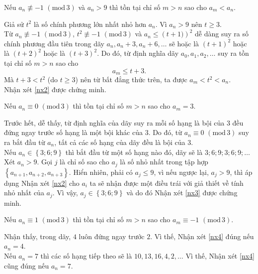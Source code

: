\begin{bt}
{		\begin{nx}[2]\label{nx2} Nếu $a_n\not\equiv-1\,\, (\mbox{mod}\,3)$ và $a_n>9$ thì tồn tại chỉ số $m>n$ sao cho $a_m<a_n$.
		\end{nx}
		\begin{cm} Giả sử $t^2$ là số chính phương lớn nhất nhỏ hơn $a_n$. Vì $a_n>9$ nên $t\geq 3$.\\
			Từ $a_n\not\equiv-1\,\, (\mbox{mod}\,3)$, $t^2\not\equiv-1\,\, (\mbox{mod}\,3)$ và $a_n\leq\left(t+1)\right)^2$ dễ dàng suy ra số chính phương đầu tiên trong dãy $a_n,a_n+3,a_n+6,\ldots$ sẽ hoặc là $\left(t+1\right)^2$ hoặc là $\left(t+2\right)^2$ hoặc là $\left(t+3\right)^2$. Do đó, từ định nghĩa dãy $a_0,a_1,a_2,\ldots$ suy ra tồn tại chỉ số $m>n$ sao cho $$a_m\leq t+3.$$ 
			Mà $t+3<t^2$ (do $t\geq 3$) nên từ bất đẳng thức trên, ta được $a_m<t^2<a_n$.\\
			Nhận xét \ref{nx2} được chứng minh.
		\end{cm}
		\begin{nx}[3]\label{nx3} Nếu $a_n\equiv 0\,\, (\mbox{mod}\,3)$ thì tồn tại chỉ số $m>n$ sao cho $a_m=3$.
		\end{nx}
		\begin{cm} Trước hết, dễ thấy, từ định nghĩa của dãy suy ra mỗi số hạng là bội của $3$ đều đứng ngay trước số hạng là một bội khác của $3$. Do đó, từ $a_n\equiv 0\,\, (\mbox{mod}\,3)$ suy ra  bắt đầu từ $a_n$, tất cả các số hạng của dãy đều là bội của $3$.\\
			Nếu $a_n\in\left\{3;6;9\right\}$ thì bắt đầu từ một số hạng nào đó, dãy sẽ là $3; 6; 9; 3; 6; 9;\ldots$\\
			Xét $a_n>9$. Gọi $j$ là chỉ số sao cho $a_j$ là số nhỏ nhất trong tập hợp $\left\{a_{n+1},a_{n+2},a_{n+3}\right\}$. Hiển nhiên, phải có $a_j\leq 9$, vì nếu ngược lại, $a_j>9$, thì áp dụng Nhận xét \ref{nx2} cho $a_i$ ta sẽ nhận được một điều trái với giả thiết về tính nhỏ nhất của $a_j$. Vì vậy, $a_j\in\left\{3;6;9\right\}$ và do đó Nhận xét \ref{nx3} được chứng minh.
		\end{cm}
		\begin{nx}[4]\label{nx4} Nếu $a_n\equiv 1\,\, (\mbox{mod}\,3)$ thì tồn tại chỉ số $m>n$ sao cho $a_m\equiv -1\,\, (\mbox{mod}\,3)$.\end{nx}
		\begin{cm} Nhận thấy, trong dãy, $4$ luôn đứng ngay trước $2$. Vì thế, Nhận xét \ref{nx4} đúng nếu $a_n=4$.\\
			Nếu $a_n=7$ thì các số hạng tiếp theo sẽ là $10, 13, 16, 4, 2, \ldots$ Vì thế, Nhận xét \ref{nx4} cũng đúng nếu $a_n=7$.\\

\end{cm}}
\end{bt}
